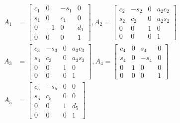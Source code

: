 \begin{align*}
A_1 &= \begin{bmatrix} 
            c_1 & 0 & -s_1 & 0\\
            s_1 & 0 & c_1 & 0\\
            0 & -1 & 0 & d_1\\
            0 & 0 & 0 & 1
        \end{bmatrix},
A_2 = \begin{bmatrix} 
            c_2 & -s_2 & 0 & a_2c_2\\
            s_2 & c_2 & 0 & a_2s_2\\
            0 & 0 & 1 & 0\\
            0 & 0 & 0 & 1
        \end{bmatrix}\\
A_3 &= \begin{bmatrix} 
            c_3 & -s_3 & 0 & a_3c_3\\
            s_3 & c_3 & 0 & a_3s_3\\
            0 & 0 & 1 & 0\\
            0 & 0 & 0 & 1
        \end{bmatrix},
A_4 = \begin{bmatrix} 
            c_4 & 0 & s_4 & 0\\
            s_4 & 0 & -s_4 & 0\\
            0 & 1 & 0 & 0\\
            0 & 0 & 0 & 1
        \end{bmatrix}\\
A_5 &= \begin{bmatrix} 
            c_5 & -s_5 & 0 & 0\\
            s_5 & c_5 & 0 & 0\\
            0 & 0 & 1 & d_5 \\
            0 & 0 & 0 & 1
        \end{bmatrix}
\end{align*}

